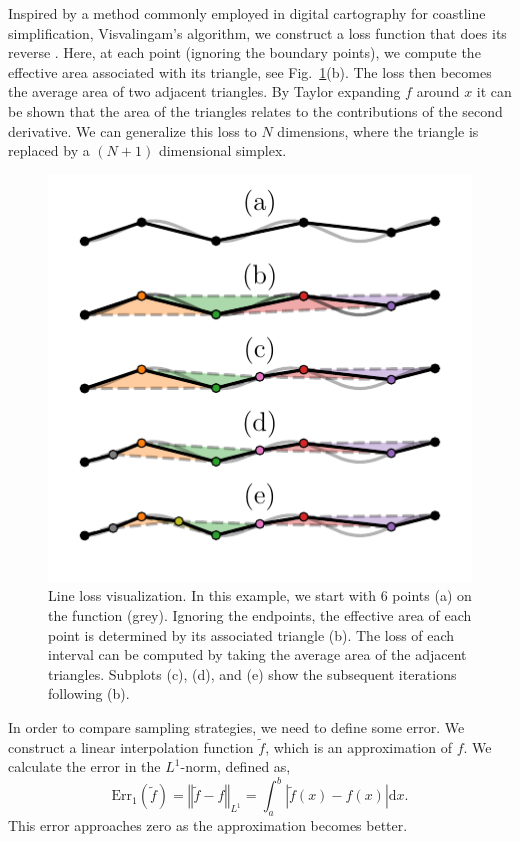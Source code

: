 
Inspired by a method commonly employed in digital cartography for coastline simplification, Visvalingam's algorithm, we construct a loss function that does its reverse \cite{Visvalingam1990}.
Here, at each point (ignoring the boundary points), we compute the effective area associated with its triangle, see Fig.~\ref{fig:line_loss}(b).
The loss then becomes the average area of two adjacent triangles.
By Taylor expanding $f$ around $x$ it can be shown that the area of the triangles relates to the contributions of the second derivative.
We can generalize this loss to $N$ dimensions, where the triangle is replaced by a $(N+1)$ dimensional simplex.

\begin{figure}
\centering
\includegraphics{chapter_adaptive/figures/line_loss.pdf}
\caption{Line loss visualization.
In this example, we start with 6 points (a) on the function (grey).
Ignoring the endpoints, the effective area of each point is determined by its associated triangle (b).
The loss of each interval can be computed by taking the average area of the adjacent triangles.
Subplots (c), (d), and (e) show the subsequent iterations following (b).\label{fig:line_loss}}
\end{figure}

In order to compare sampling strategies, we need to define some error.
We construct a linear interpolation function $\tilde{f}$, which is an approximation of $f$.
We calculate the error in the $L^{1}$-norm, defined as,
\[
\text{Err}_{1}(\tilde{f})=\left\Vert \tilde{f}-f\right\Vert _{L^{1}}=\int_{a}^{b}\left|\tilde{f}(x)-f(x)\right|\text{d}x.
\]
This error approaches zero as the approximation becomes better.

